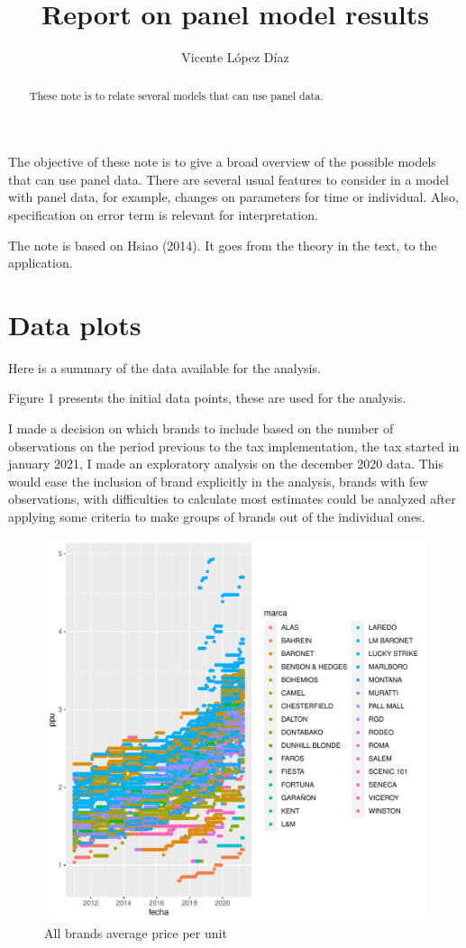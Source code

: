 \documentclass[]{article}
\title{Report on panel model results}
\author{Vicente López Díaz}
\begin{document}
\maketitle


\begin{abstract}
These note is to relate several models that can use panel data.
\end{abstract}

The objective of these note is to give a broad overview of the possible models that can use panel data. There are several usual features to consider in a model with panel data, for example, changes on parameters for time or individual. Also, specification on error term is relevant for interpretation.

The note is based on Hsiao (2014). It goes from the theory in the text, to the application.

\section{Data plots}
Here is a summary of the data available for the analysis. 

Figure 1 presents the initial data points, these are used for the analysis.

I made a decision on which brands to include based on the number of observations on the period previous to the tax implementation, the tax started in january 2021, I made an exploratory analysis on the december 2020 data. This would ease the inclusion of brand explicitly in the analysis, brands with few observations, with difficulties to calculate most estimates could be analyzed after applying some criteria to make groups of brands out of the individual ones.


\begin{figure}
\begin{center}
\includegraphics[width=\textwidth]{df_review_ppu_marcas.pdf} 
\end{center}
 \caption{All brands average price per unit}
\end{figure}
\end{document}
